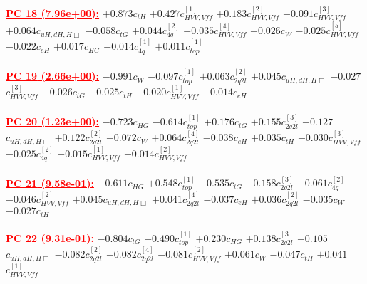 \documentclass{article}
\begin{document}
\noindent \textcolor{red}{\underline{\bf{PC 18} (7.96e+00):}}
{$+0.873$}{\rm $c_{tH}$} 
{$+0.427$}{\rm $c_{HVV,Vff}^{[1]}$} 
{$+0.183$}{\rm $c_{HVV,Vff}^{[2]}$} 
{$-0.091$}{\rm $c_{HVV,Vff}^{[3]}$} 
{$+0.064$}{\rm $c_{uH,dH,H\Box}$} 
{$-0.058$}{\rm $c_{tG}$} 
{$+0.044$}{\rm $c_{4q}^{[2]}$} 
{$-0.035$}{\rm $c_{HVV,Vff}^{[4]}$} 
{$-0.026$}{\rm $c_{W}$} 
{$-0.025$}{\rm $c_{HVV,Vff}^{[5]}$} 
{$-0.022$}{\rm $c_{eH}$} 
{$+0.017$}{\rm $c_{HG}$} 
{$-0.014$}{\rm $c_{4q}^{[1]}$} 
{$+0.011$}{\rm $c_{top}^{[1]}$} 
 \nonumber \\ \nonumber \\ 
\noindent \textcolor{red}{\underline{\bf{PC 19} (2.66e+00):}}
{$-0.991$}{\rm $c_{W}$} 
{$-0.097$}{\rm $c_{top}^{[1]}$} 
{$+0.063$}{\rm $c_{2q2l}^{[2]}$} 
{$+0.045$}{\rm $c_{uH,dH,H\Box}$} 
{$-0.027$}{\rm $c_{HVV,Vff}^{[3]}$} 
{$-0.026$}{\rm $c_{tG}$} 
{$-0.025$}{\rm $c_{tH}$} 
{$-0.020$}{\rm $c_{HVV,Vff}^{[1]}$} 
{$-0.014$}{\rm $c_{eH}$} 
 \nonumber \\ \nonumber \\ 
\noindent \textcolor{red}{\underline{\bf{PC 20} (1.23e+00):}}
{$-0.723$}{\rm $c_{HG}$} 
{$-0.614$}{\rm $c_{top}^{[1]}$} 
{$+0.176$}{\rm $c_{tG}$} 
{$+0.155$}{\rm $c_{2q2l}^{[3]}$} 
{$+0.127$}{\rm $c_{uH,dH,H\Box}$} 
{$+0.122$}{\rm $c_{2q2l}^{[2]}$} 
{$+0.072$}{\rm $c_{W}$} 
{$+0.064$}{\rm $c_{2q2l}^{[4]}$} 
{$-0.038$}{\rm $c_{eH}$} 
{$+0.035$}{\rm $c_{tH}$} 
{$-0.030$}{\rm $c_{HVV,Vff}^{[3]}$} 
{$-0.025$}{\rm $c_{4q}^{[2]}$} 
{$-0.015$}{\rm $c_{HVV,Vff}^{[1]}$} 
{$-0.014$}{\rm $c_{HVV,Vff}^{[2]}$} 
 \nonumber \\ \nonumber \\ 
\noindent \textcolor{red}{\underline{\bf{PC 21} (9.58e-01):}}
{$-0.611$}{\rm $c_{HG}$} 
{$+0.548$}{\rm $c_{top}^{[1]}$} 
{$-0.535$}{\rm $c_{tG}$} 
{$-0.158$}{\rm $c_{2q2l}^{[3]}$} 
{$-0.061$}{\rm $c_{4q}^{[2]}$} 
{$-0.046$}{\rm $c_{HVV,Vff}^{[2]}$} 
{$+0.045$}{\rm $c_{uH,dH,H\Box}$} 
{$+0.041$}{\rm $c_{2q2l}^{[4]}$} 
{$-0.037$}{\rm $c_{eH}$} 
{$+0.036$}{\rm $c_{2q2l}^{[2]}$} 
{$-0.035$}{\rm $c_{W}$} 
{$-0.027$}{\rm $c_{tH}$} 
 \nonumber \\ \nonumber \\ 
\noindent \textcolor{red}{\underline{\bf{PC 22} (9.31e-01):}}
{$-0.804$}{\rm $c_{tG}$} 
{$-0.490$}{\rm $c_{top}^{[1]}$} 
{$+0.230$}{\rm $c_{HG}$} 
{$+0.138$}{\rm $c_{2q2l}^{[3]}$} 
{$-0.105$}{\rm $c_{uH,dH,H\Box}$} 
{$-0.082$}{\rm $c_{2q2l}^{[2]}$} 
{$+0.082$}{\rm $c_{2q2l}^{[4]}$} 
{$-0.081$}{\rm $c_{HVV,Vff}^{[2]}$} 
{$+0.061$}{\rm $c_{W}$} 
{$-0.047$}{\rm $c_{tH}$} 
{$+0.041$}{\rm $c_{HVV,Vff}^{[1]}$} 
\end{document}
